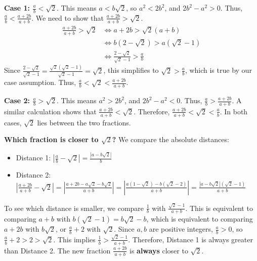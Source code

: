 \textbf{Case 1: $\frac{a}{b} < \sqrt{2}$}. This means $a < b\sqrt{2}$, so $a^2 < 2b^2$, and $2b^2 - a^2 > 0$.
Thus, $\frac{a}{b} < \frac{a+2b}{a+b}$. We need to show that $\frac{a+2b}{a+b} > \sqrt{2}$.
\begin{align*}
\frac{a + 2b}{a + b} > \sqrt{2} &\iff a + 2b > \sqrt{2}(a + b)\\
&\iff b(2 - \sqrt{2}) > a(\sqrt{2} - 1)\\
&\iff \frac{2 - \sqrt{2}}{\sqrt{2} - 1} > \frac{a}{b}
\end{align*}
Since $\frac{2 - \sqrt{2}}{\sqrt{2} - 1} = \frac{\sqrt{2}(\sqrt{2} - 1)}{\sqrt{2} - 1} = \sqrt{2}$, this simplifies to $\sqrt{2} > \frac{a}{b}$, which is true by our case assumption. Thus, $\frac{a}{b} < \sqrt{2} < \frac{a + 2b}{a + b}$.

\textbf{Case 2: $\frac{a}{b} > \sqrt{2}$}. This means $a^2 > 2b^2$, and $2b^2 - a^2 < 0$.
Thus, $\frac{a}{b} > \frac{a+2b}{a+b}$. A similar calculation shows that $\frac{a+2b}{a+b} < \sqrt{2}$.
Therefore, $\frac{a+2b}{a+b} < \sqrt{2} < \frac{a}{b}$. In both cases, $\sqrt{2}$ lies between the two fractions.

\textbf{Which fraction is closer to $\sqrt{2}$?}
We compare the absolute distances:
\begin{itemize}
\item Distance 1: $\left|\frac{a}{b} - \sqrt{2}\right| = \frac{|a - b\sqrt{2}|}{b}$
\item Distance 2: $\left|\frac{a + 2b}{a + b} - \sqrt{2}\right| = \left|\frac{a + 2b - a\sqrt{2} - b\sqrt{2}}{a + b}\right| = \left|\frac{a(1-\sqrt{2}) - b(\sqrt{2}-2)}{a + b}\right| = \frac{|a - b\sqrt{2}|(\sqrt{2}-1)}{a+b}$
\end{itemize}
To see which distance is smaller, we compare $\frac{1}{b}$ with $\frac{\sqrt{2}-1}{a+b}$.
This is equivalent to comparing $a+b$ with $b(\sqrt{2}-1) = b\sqrt{2} - b$, which is equivalent to comparing $a+2b$ with $b\sqrt{2}$, or $\frac{a}{b} + 2$ with $\sqrt{2}$.
Since $a, b$ are positive integers, $\frac{a}{b} > 0$, so $\frac{a}{b} + 2 > 2 > \sqrt{2}$.
This implies $\frac{1}{b} > \frac{\sqrt{2}-1}{a+b}$.
Therefore, Distance 1 is always greater than Distance 2. The new fraction $\frac{a+2b}{a+b}$ is \textbf{always} closer to $\sqrt{2}$.

